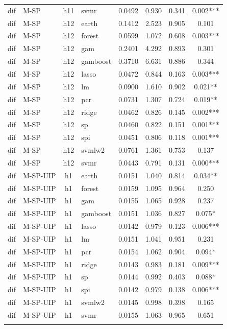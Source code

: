 \begin{ThreePartTable}
\begin{longtable}[t]{llclcccc}
dif & M-SP & h11 & svmr & 0.0492 & 0.930 & 0.341 & 0.002***\\
\addlinespace
dif & M-SP & h12 & earth & 0.1412 & 2.523 & 0.905 & 0.101\\
dif & M-SP & h12 & forest & 0.0599 & 1.072 & 0.608 & 0.003***\\
dif & M-SP & h12 & gam & 0.2401 & 4.292 & 0.893 & 0.301\\
dif & M-SP & h12 & gamboost & 0.3710 & 6.631 & 0.886 & 0.344\\
dif & M-SP & h12 & lasso & 0.0472 & 0.844 & 0.163 & 0.003***\\
dif & M-SP & h12 & lm & 0.0900 & 1.610 & 0.902 & 0.021**\\
dif & M-SP & h12 & pcr & 0.0731 & 1.307 & 0.724 & 0.019**\\
dif & M-SP & h12 & ridge & 0.0462 & 0.826 & 0.145 & 0.002***\\
dif & M-SP & h12 & sp & 0.0460 & 0.822 & 0.151 & 0.001***\\
dif & M-SP & h12 & spi & 0.0451 & 0.806 & 0.118 & 0.001***\\
dif & M-SP & h12 & svmlw2 & 0.0761 & 1.361 & 0.753 & 0.137\\
dif & M-SP & h12 & svmr & 0.0443 & 0.791 & 0.131 & 0.000***\\
\addlinespace
dif & M-SP-UIP & h1 & earth & 0.0151 & 1.040 & 0.814 & 0.034**\\
dif & M-SP-UIP & h1 & forest & 0.0159 & 1.095 & 0.964 & 0.250\\
dif & M-SP-UIP & h1 & gam & 0.0155 & 1.065 & 0.928 & 0.237\\
dif & M-SP-UIP & h1 & gamboost & 0.0151 & 1.036 & 0.827 & 0.075*\\
dif & M-SP-UIP & h1 & lasso & 0.0142 & 0.979 & 0.123 & 0.006***\\
dif & M-SP-UIP & h1 & lm & 0.0151 & 1.041 & 0.951 & 0.231\\
dif & M-SP-UIP & h1 & pcr & 0.0154 & 1.062 & 0.904 & 0.094*\\
dif & M-SP-UIP & h1 & ridge & 0.0143 & 0.983 & 0.181 & 0.009***\\
dif & M-SP-UIP & h1 & sp & 0.0144 & 0.992 & 0.403 & 0.088*\\
dif & M-SP-UIP & h1 & spi & 0.0142 & 0.979 & 0.138 & 0.006***\\
dif & M-SP-UIP & h1 & svmlw2 & 0.0145 & 0.998 & 0.398 & 0.165\\
dif & M-SP-UIP & h1 & svmr & 0.0155 & 1.063 & 0.965 & 0.651\\
\addlinespace

\end{longtable}
\end{ThreePartTable}
